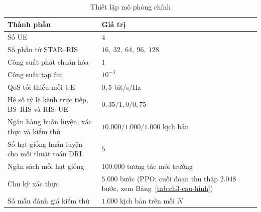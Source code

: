 \begin{table}[htbp]
\centering
\caption{Thiết lập mô phỏng chính}
\label{tab:ch4-thiet-lap}
\footnotesize
\begin{tabularx}{\textwidth}{@{}X l@{}}
\toprule
\textbf{Thành phần} & \textbf{Giá trị} \\
\midrule
Số UE & $4$ \\
Số phần tử STAR--RIS & $16,\ 32,\ 64,\ 96,\ 128$ \\
Công suất phát chuẩn hóa & $1$ \\
Công suất tạp âm & $10^{-3}$ \\
QoS tối thiểu mỗi UE & $0,5$ bit/s/Hz \\
Hệ số tỷ lệ kênh trực tiếp, BS--RIS và RIS--UE & $0,35 / 1,0 / 0,75$ \\
Ngân hàng huấn luyện, xác thực và kiểm thử & $10.000 / 1.000 / 1.000$ kịch bản \\
Số hạt giống huấn luyện cho mỗi thuật toán DRL & $5$ \\
Ngân sách mỗi hạt giống & $100.000$ tương tác môi trường \\
Chu kỳ xác thực & $5.000$ bước (PPO: cuối đoạn thu thập $2.048$ bước, xem Bảng~\ref{tab:ch3-cau-hinh}) \\
Số mẫu đánh giá kiểm thử & $1.000$ kịch bản trên mỗi $N$ \\
\bottomrule
\end{tabularx}
\end{table}
